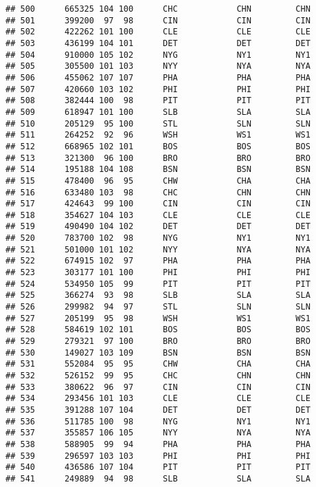 \documentclass[]{article}
\begin{document}
\begin{verbatim}
## 500      665325 104 100      CHC            CHN         CHN
## 501      399200  97  98      CIN            CIN         CIN
## 502      422262 101 100      CLE            CLE         CLE
## 503      436199 104 101      DET            DET         DET
## 504      910000 105 102      NYG            NY1         NY1
## 505      305500 101 103      NYY            NYA         NYA
## 506      455062 107 107      PHA            PHA         PHA
## 507      420660 103 102      PHI            PHI         PHI
## 508      382444 100  98      PIT            PIT         PIT
## 509      618947 101 100      SLB            SLA         SLA
## 510      205129  95 100      STL            SLN         SLN
## 511      264252  92  96      WSH            WS1         WS1
## 512      668965 102 101      BOS            BOS         BOS
## 513      321300  96 100      BRO            BRO         BRO
## 514      195188 104 108      BSN            BSN         BSN
## 515      478400  96  95      CHW            CHA         CHA
## 516      633480 103  98      CHC            CHN         CHN
## 517      424643  99 100      CIN            CIN         CIN
## 518      354627 104 103      CLE            CLE         CLE
## 519      490490 104 102      DET            DET         DET
## 520      783700 102  98      NYG            NY1         NY1
## 521      501000 101 102      NYY            NYA         NYA
## 522      674915 102  97      PHA            PHA         PHA
## 523      303177 101 100      PHI            PHI         PHI
## 524      534950 105  99      PIT            PIT         PIT
## 525      366274  93  98      SLB            SLA         SLA
## 526      299982  94  97      STL            SLN         SLN
## 527      205199  95  98      WSH            WS1         WS1
## 528      584619 102 101      BOS            BOS         BOS
## 529      279321  97 100      BRO            BRO         BRO
## 530      149027 103 109      BSN            BSN         BSN
## 531      552084  95  95      CHW            CHA         CHA
## 532      526152  99  95      CHC            CHN         CHN
## 533      380622  96  97      CIN            CIN         CIN
## 534      293456 101 103      CLE            CLE         CLE
## 535      391288 107 104      DET            DET         DET
## 536      511785 100  98      NYG            NY1         NY1
## 537      355857 106 105      NYY            NYA         NYA
## 538      588905  99  94      PHA            PHA         PHA
## 539      296597 103 103      PHI            PHI         PHI
## 540      436586 107 104      PIT            PIT         PIT
## 541      249889  94  98      SLB            SLA         SLA

\end{verbatim}
\end{document}
